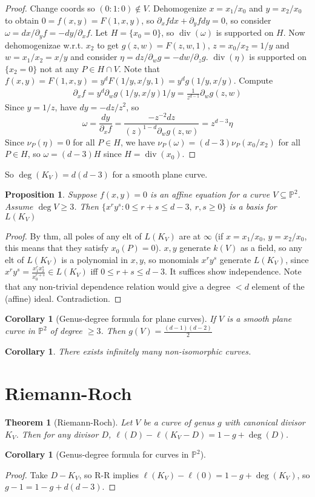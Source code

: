 \documentclass{article}
\theoremstyle{definition}
\theoremstyle{remark}
\theoremstyle{plain}
\newtheorem{thm}[defn]{Theorem}
\newtheorem{prop}[defn]{Proposition}
\newtheorem{crly}[defn]{Corollary}
\newcommand{\PP}{\mathbb{P}}
\newcommand{\divi}{\operatorname{div}}
\begin{document}
\begin{proof}
    Change coords so $(0:1:0)\notin V$. Dehomogenize $x=x_1/x_0$ and $y=x_2/x_0$ to obtain $0=f(x,y)=F(1,x,y)$, so $\partial_x fdx+\partial_yfdy=0$, so consider $\omega=dx/\partial_yf=-dy/\partial_xf$. Let $H=\{x_0=0\}$, so $\divi(\omega)$ is supported on $H$. Now dehomogenizae w.r.t. $x_2$ to get $g(z,w)=F(z,w,1)$, $z=x_0/x_2=1/y$ and $w=x_1/x_2=x/y$ and consider $\eta=dz/\partial_wg=-dw/\partial_zg$. $\divi(\eta)$ is supported on $\{x_2=0\}$ not at any $P\in H\cap V$. Note that $f(x,y)=F(1,x,y)=y^dF(1/y,x/y,1)=y^dg(1/y,x/y)$. Compute
    \begin{align*}
        \partial_xf=y^d\partial_wg(1/y,x/y)1/y=\frac{1}{z^{d-1}}\partial_wg(z,w)
    \end{align*} Since $y=1/z$, have $dy=-dz/z^2$, so 
    \[\omega=\frac{dy}{\partial_xf}=\frac{-z^{-2}dz}{(z)^{1-d}\partial_wg(z,w)}=z^{d-3}\eta\] 
    Since $\nu_P(\eta)=0$ for all $P\in H$, we have $\nu_P(\omega)=(d-3)\nu_P(x_0/x_2)$ for all $P\in H$, so $\omega=(d-3)H$ since $H=\divi(x_0)$.
\end{proof}
So $\deg(K_V)=d(d-3)$ for a smooth plane curve.
\begin{prop}
    Suppose $f(x,y)=0$ is an affine equation for a curve $V\subseteq\PP^2$. Assume $\deg V\ge3$. Then $\{x^ry^s:0\le r+s\le d-3,\ r,s\ge 0\}$ is a basis for $L(K_V)$
\end{prop}
\begin{proof}
    By thm, all poles of any elt of $L(K_V)$ are at $\infty$ (if $x=x_1/x_0$, $y=x_2/x_0$, this means that they satisfy $x_0(P)=0$). $x,y$ generate $k(V)$ as a field, so any elt of $L(K_V)$ is a polynomial in $x,y$, so monomials $x^ry^s$ generate $L(K_V)$, since $x^ry^s=\frac{x_1^rx_2^s}{x_0^{r+s}}\in L(K_V)$ iff $0\le r+s\le d-3$. It suffices show independence. Note that any non-trivial dependence relation would give a degree $<d$ element of the (affine) ideal. Contradiction.
\end{proof}
\begin{crly}[Genus-degree formula for plane curves]
    If $V$ is a smooth plane curve in $\PP^2$ of degree $\ge3$. Then $g(V)=\frac{(d-1)(d-2)}{2}$
\end{crly}
\begin{crly}
    There exists infinitely many non-isomorphic curves.
\end{crly}
\section{Riemann-Roch}
\begin{thm}[Riemann-Roch]
    Let $V$ be a curve of genus $g$ with canonical divisor $K_V$. Then for any divisor $D$, $\ell(D)-\ell(K_V-D)=1-g+\deg(D)$.
\end{thm}
\begin{crly}[Genus-degree formula for curves in $\PP^2$]\end{crly}
\begin{proof}
    Take $D-K_V$, so R-R implies $\ell(K_V)-\ell(0)=1-g+\deg(K_V)$, so $g-1=1-g+d(d-3)$. 
\end{proof}
\end{document}
